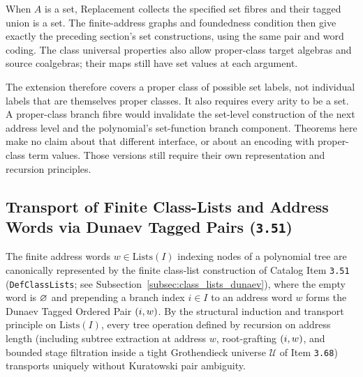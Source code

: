 When $A$ is a set, Replacement collects the specified set fibres and
their tagged union is a set. The finite-address graphs and foundedness
condition then give exactly the preceding section's set constructions,
using the same pair and word coding. The class universal properties
also allow proper-class target algebras and source coalgebras; their
maps still have set values at each argument.

The extension therefore covers a proper class of possible set labels,
not individual labels that are themselves proper classes. It also
requires every arity to be a set. A proper-class branch fibre would
invalidate the set-level construction of the next address level and
the polynomial's set-function branch component. Theorems here make no
claim about that different interface, or about an encoding with
proper-class term values. Those versions still require their own
representation and recursion principles.

\subsection{Transport of Finite Class-Lists and Address Words via Dunaev Tagged Pairs (\texttt{3.51})}
\label{subsec:polynomial_tree_class_lists_transport}

The finite address words $w \in \mathrm{Lists}(I)$ indexing nodes of a polynomial tree are canonically represented by the finite class-list construction of Catalog Item \texttt{3.51} (\texttt{DefClassLists}; see Subsection~\ref{subsec:class_lists_dunaev}), where the empty word is $\varnothing$ and prepending a branch index $i \in I$ to an address word $w$ forms the Dunaev Tagged Ordered Pair $(i,w)$. By the structural induction and transport principle on $\mathrm{Lists}(I)$, every tree operation defined by recursion on address length (including subtree extraction at address $w$, root-grafting $(i,w)$, and bounded stage filtration inside a tight Grothendieck universe $\mathcal{U}$ of Item \texttt{3.68}) transports uniquely without Kuratowski pair ambiguity.


